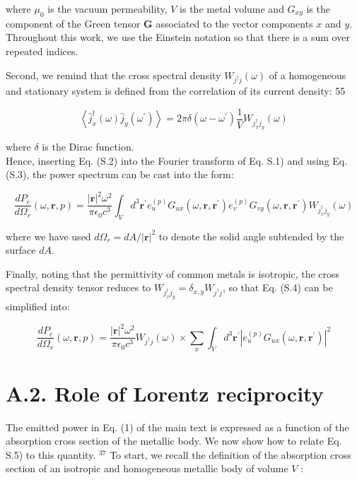 \documentclass[10pt]{article}
\begin{document}
where $\mu_{0}$ is the vacuum permeability, $V$ is the metal volume and $G_{x y}$ is the component of the Green tensor $\boldsymbol{G}$ associated to the vector components $x$ and $y$. Throughout this work, we use the Einstein notation so that there is a sum over repeated indices.

Second, we remind that the cross spectral density $W_{j^{\dagger} j}(\omega)$ of a homogeneous and stationary system is defined from the correlation of its current density: 55


\begin{equation*}
\left\langle\hat{j}_{x}^{\dagger}(\omega) \hat{j}_{y}\left(\omega^{\prime}\right)\right\rangle=2 \pi \delta\left(\omega-\omega^{\prime}\right) \frac{1}{V} W_{j_{x}^{\dagger} j_{y}}(\omega) \tag{S.3}
\end{equation*}


where $\delta$ is the Dirac function.\\
Hence, inserting Eq. (S.2) into the Fourier transform of Eq. S.1) and using Eq. (S.3), the power spectrum can be cast into the form:


\begin{equation*}
\frac{d P_{e}}{d \Omega_{r}}(\omega, \boldsymbol{r}, p)=\frac{|\boldsymbol{r}|^{2} \omega^{2}}{\pi \epsilon_{0} c^{3}} \int_{V} d^{3} \boldsymbol{r}^{\prime} e_{u}^{(p)} G_{u x}\left(\omega, \boldsymbol{r}, \boldsymbol{r}^{\prime}\right) e_{v}^{(p)} G_{v y}\left(\omega, \boldsymbol{r}, \boldsymbol{r}^{\prime}\right) W_{j_{x}^{\dagger} j_{y}}(\omega) \tag{S.4}
\end{equation*}


where we have used $d \Omega_{r}=d A /|\boldsymbol{r}|^{2}$ to denote the solid angle subtended by the surface $d A$.

Finally, noting that the permittivity of common metals is isotropic, the cross spectral density tensor reduces to $W_{j_{x}^{\dagger} j_{y}}=\delta_{x, y} W_{j^{\dagger} j}$, so that Eq. (S.4) can be simplified into:


\begin{equation*}
\frac{d P_{e}}{d \Omega_{r}}(\omega, \boldsymbol{r}, p)=\frac{|\boldsymbol{r}|^{2} \omega^{2}}{\pi \epsilon_{0} c^{3}} W_{j^{\dagger} j}(\omega) \times \sum_{x} \int_{V} d^{3} \boldsymbol{r}^{\prime}\left|e_{u}^{(p)} G_{u x}\left(\omega, \boldsymbol{r}, \boldsymbol{r}^{\prime}\right)\right|^{2} \tag{S.5}
\end{equation*}


\section*{A.2. Role of Lorentz reciprocity}
The emitted power in Eq. (1) of the main text is expressed as a function of the absorption cross section of the metallic body. We now show how to relate Eq. S.5) to this quantity. ${ }^{37}$ To start, we recall the definition of the absorption cross section of an isotropic and homogeneous metallic body of volume $V$ :
\end{document}
